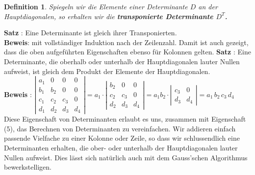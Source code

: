 \documentclass[a4paper,10pt]{report}
\newtheorem{mydef}{Definition}
\begin{document}
\vspace{1cm}
\begin{mydef}
Spiegeln wir die Elemente einer Determinante $D$ an
der Hauptdiagonalen, so erhalten wir die
\textit{\textbf{transponierte Determinante $D^{T}$.}}
\end{mydef}
\vspace{0.5cm}
\textbf{Satz} : Eine Determinante ist gleich ihrer
Transponierten.\\
\textbf{Beweis}: mit vollst\"{a}ndiger Induktion nach der Zeilenzahl.
Damit ist auch gezeigt, dass die oben aufgef\"{u}hrten Eigenschaften
ebenso f\"{u}r Kolonnen gelten.
\newpage
\noindent
\textbf{Satz} : Eine Determinante, die oberhalb oder unterhalb der
Hauptdiagonalen lauter Nullen aufweist, ist gleich dem Produkt der
Elemente der Hauptdiagonalen.\\
\vspace{0.3cm}
\textbf{Beweis} : $ \left | \begin {array}{cccc} a_1 & 0 & 0 & 0\\
                                b_1 & b_2 & 0 & 0 \\
                                c_1 & c_2 & c_3 & 0\\
                                d_1 & d_2 & d_3 & d_4\end{array} \right | =
a_1 \cdot \left | \begin {array}{ccc}  b_2 & 0 & 0 \\
                                       c_2 & c_3 & 0\\
                                       d_2 & d_3 & d_4\end{array} \right | =
a_1b_2 \cdot \left | \begin {array}{cc} c_3 & 0\\
                                        d_3 & d_4\end{array} \right |
                                = a_1\,b_2\,c_3\,d_4$
\\
Diese Eigenschaft von Determinanten erlaubt es uns, zusammen mit
Eigenschaft (5), das Berechnen von Determinanten zu vereinfachen.
Wir addieren einfach passende Vielfache zu einer Kolonne oder
Zeile, so dass wir schlussendlich eine Determinanten erhalten, die
ober- oder unterhalb der Hauptdiagonalen lauter Nullen aufweist.
Dies l\"{a}sst sich nat\"{u}rlich auch mit dem Gauss'schen Algorithmus
bewerkstelligen.

\vspace{0.5cm}
\end{document}
